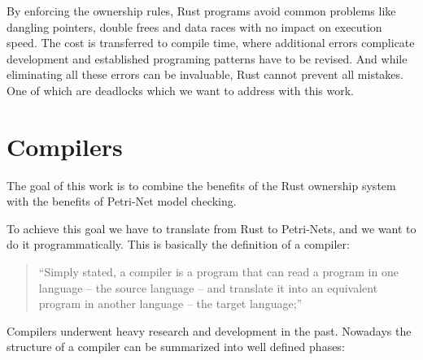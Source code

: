 By enforcing the ownership rules, Rust programs avoid common problems like dangling pointers, double frees and data races\cite{Matsakis:2014:RL:2692956.2663188} with no impact on execution speed.
The cost is transferred to compile time, where additional errors complicate development and established programing patterns have to be revised.
And while eliminating all these errors can be invaluable, Rust cannot prevent all mistakes.
One of which are deadlocks\cite[Chapter 8.1]{nomicon} which we want to address with this work.

\section{Compilers}
The goal of this work is to combine the benefits of the Rust ownership system with the benefits of Petri-Net model checking.

To achieve this goal we have to translate from Rust to Petri-Nets, 
and we want to do it programmatically.
This is basically the definition of a compiler\cite[Chapter 1.1]{aho1986compilers}:
\begin{quote}
``Simply stated, a compiler is a program that can read a program in one language -- the source language -- and translate it into an equivalent program in another language -- the target language;''
\end{quote}

Compilers underwent heavy research and development in the past.
Nowadays the structure of a compiler can be summarized into well defined phases\cite[Chapter 1.2]{aho1986compilers}:

